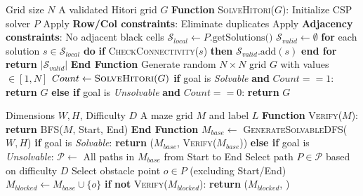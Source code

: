 \begin{algorithm}[t]
\caption{Hitori Generation via CSP}
\label{alg:hitori}
\begin{algorithmic}[1]
\REQUIRE Grid size $N$
\ENSURE A validated Hitori grid $G$
\STATE \textbf{Function} \textsc{SolveHitori}($G$):
\STATE \quad Initialize CSP solver $P$
\STATE \quad Apply \textbf{Row/Col constraints}: Eliminate duplicates
\STATE \quad Apply \textbf{Adjacency constraints}: No adjacent black cells
\STATE \quad $\mathcal{S}_{local} \leftarrow P.\text{getSolutions()}$
\STATE \quad $\mathcal{S}_{valid} \leftarrow \emptyset$
\STATE \quad \textbf{for} each solution $s \in \mathcal{S}_{local}$ \textbf{do}
\STATE \quad \quad \textbf{if} \textsc{CheckConnectivity}($s$) \textbf{then} $\mathcal{S}_{valid}.\text{add}(s)$
\STATE \quad \textbf{end for}
\STATE \quad \textbf{return} $|\mathcal{S}_{valid}|$
\STATE \textbf{End Function}
\REPEAT
\STATE Generate random $N \times N$ grid $G$ with values $\in [1, N]$
\STATE $Count \leftarrow \textsc{SolveHitori}(G)$
\STATE \textbf{if} goal is \textit{Solvable} \textbf{and} $Count == 1$:
\STATE \quad \textbf{return} $G$ 
\STATE \textbf{else if} goal is \textit{Unsolvable} \textbf{and} $Count == 0$:
\STATE \quad \textbf{return} $G$ 
\end{algorithmic}
\end{algorithm}



\begin{algorithm}[t]
\caption{Maze Generation with Strategic Blockage}
\label{alg:maze}
\begin{algorithmic}[1]
\REQUIRE Dimensions $W, H$, Difficulty $D$
\ENSURE A maze grid $M$ and label $L$
\STATE \textbf{Function} \textsc{Verify}($M$):
\STATE \quad \textbf{return} \textsc{BFS}($M$, Start, End)
\STATE \textbf{End Function}
\REPEAT
\STATE $M_{base} \leftarrow$ \textsc{GenerateSolvableDFS}($W, H$)
\STATE \textbf{if} goal is \textit{Solvable}:
\STATE \quad \textbf{return} ($M_{base}$, \textsc{Verify}($M_{base}$))
\STATE \textbf{else if} goal is \textit{Unsolvable}:
\STATE \quad $\mathcal{P} \leftarrow$ All paths in $M_{base}$ from Start to End
\STATE \quad Select path $P \in \mathcal{P}$ based on difficulty $D$
\STATE \quad Select obstacle point $o \in P$ (excluding Start/End)
\STATE \quad $M_{blocked} \leftarrow M_{base} \cup \{o\}$
\STATE \quad \textbf{if} \textbf{not} \textsc{Verify}($M_{blocked}$):
\STATE \quad \quad \textbf{return} ($M_{blocked}$, )
\end{algorithmic}
\end{algorithm}


